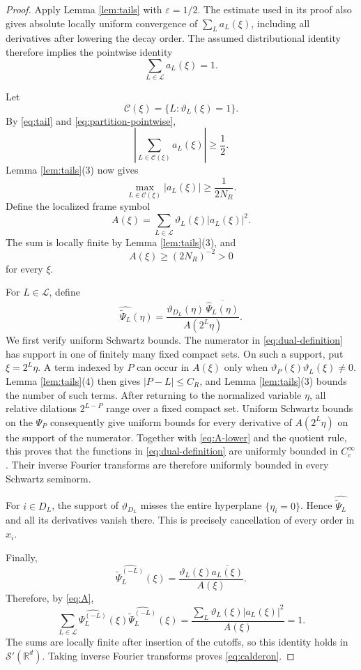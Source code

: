 \documentclass[11pt]{article}
\newcommand{\R}{\mathbb R}
\newcommand{\cC}{\mathcal C}
\newcommand{\cL}{\mathcal L}
\newcommand{\cS}{\mathcal S}
\begin{document}
\begin{proof}
Apply Lemma \ref{lem:tails} with $\varepsilon=1/2$.  The estimate used in its
proof also gives absolute locally uniform convergence of
$\sum_L a_L(\xi)$, including all derivatives after lowering the decay order.
The assumed distributional identity therefore implies the pointwise identity
\begin{equation}\label{eq:partition-pointwise}
  \sum_{L\in\cL}a_L(\xi)=1.
\end{equation}

Let
\[
  \cC(\xi)=\{L:\vartheta_L(\xi)=1\}.
\]
By \eqref{eq:tail} and \eqref{eq:partition-pointwise},
\[
  \left|\sum_{L\in\cC(\xi)}a_L(\xi)\right|\ge\frac12.
\]
Lemma \ref{lem:tails}(3) now gives
\[
  \max_{L\in\cC(\xi)}|a_L(\xi)|\ge\frac1{2N_R}.
\]
Define the localized frame symbol
\begin{equation}\label{eq:A}
  A(\xi)=\sum_{L\in\cL}\vartheta_L(\xi)|a_L(\xi)|^2.
\end{equation}
The sum is locally finite by Lemma \ref{lem:tails}(3), and
\begin{equation}\label{eq:A-lower}
  A(\xi)\ge (2N_R)^{-2}>0
\end{equation}
for every $\xi$.

For $L\in\cL$, define
\begin{equation}\label{eq:dual-definition}
 \widehat{\widetilde\Psi_L}(\eta)
   =\frac{\vartheta_{D_L}(\eta)\,
       \overline{\widehat\Psi_L(\eta)}}{A(2^L\eta)}.
\end{equation}
We first verify uniform Schwartz bounds.  The numerator in
\eqref{eq:dual-definition} has support in one of finitely many fixed compact
sets.  On such a support, put $\xi=2^L\eta$.  A term indexed by $P$ can occur
in $A(\xi)$ only when
$\vartheta_P(\xi)\vartheta_L(\xi)\ne0$.  Lemma \ref{lem:tails}(4) then gives
$|P-L|\le C_R$, and Lemma \ref{lem:tails}(3) bounds the number of such terms.
After returning to the normalized variable $\eta$, all relative dilations
$2^{L-P}$ range over a fixed compact set.  Uniform Schwartz bounds on the
$\Psi_P$ consequently give uniform bounds for every derivative of
$A(2^L\eta)$ on the support of the numerator.  Together with
\eqref{eq:A-lower} and the quotient rule, this proves that the functions in
\eqref{eq:dual-definition} are uniformly bounded in $C_c^\infty$.  Their
inverse Fourier transforms are therefore uniformly bounded in every Schwartz
seminorm.

For $i\in D_L$, the support of $\vartheta_{D_L}$ misses the entire hyperplane
$\{\eta_i=0\}$.  Hence $\widehat{\widetilde\Psi_L}$ and all its derivatives
vanish there.  This is precisely cancellation of every order in $x_i$.

Finally,
\[
 \widehat{\widetilde\Psi_L^{(-L)}}(\xi)
 =\frac{\vartheta_L(\xi)\overline{a_L(\xi)}}{A(\xi)}.
\]
Therefore, by \eqref{eq:A},
\[
 \sum_{L\in\cL}
 \widehat{\Psi_L^{(-L)}}(\xi)
 \widehat{\widetilde\Psi_L^{(-L)}}(\xi)
 =\frac{\sum_L\vartheta_L(\xi)|a_L(\xi)|^2}{A(\xi)}=1.
\]
The sums are locally finite after insertion of the cutoffs, so this identity
holds in $\cS'(\R^d)$.  Taking inverse Fourier transforms proves
\eqref{eq:calderon}.
\end{proof}
\end{document}
